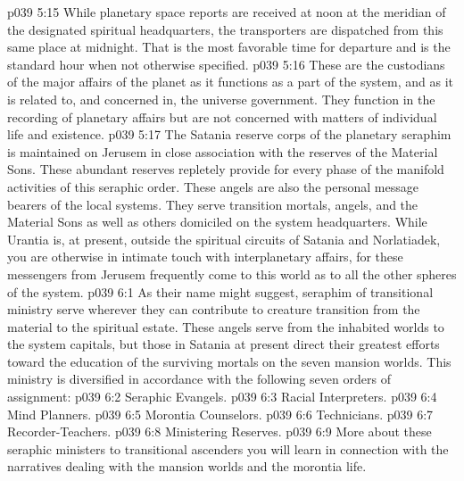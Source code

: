 \pc \vs p039 5:15 While planetary space reports are received at noon at the meridian of the designated spiritual headquarters, the transporters are dispatched from this same place at midnight. That is the most favorable time for departure and is the standard hour when not otherwise specified.
\pc \vs p039 5:16 \bibnobreakspace {} These are the custodians of the major affairs of the planet as it functions as a part of the system, and as it is related to, and concerned in, the universe government. They function in the recording of planetary affairs but are not concerned with matters of individual life and existence.
\pc \vs p039 5:17 \bibnobreakspace {} The Satania reserve corps of the planetary seraphim is maintained on Jerusem in close association with the reserves of the Material Sons. These abundant reserves repletely provide for every phase of the manifold activities of this seraphic order. These angels are also the personal message bearers of the local systems. They serve transition mortals, angels, and the Material Sons as well as others domiciled on the system headquarters. While Urantia is, at present, outside the spiritual circuits of Satania and Norlatiadek, you are otherwise in intimate touch with interplanetary affairs, for these messengers from Jerusem frequently come to this world as to all the other spheres of the system.
\vs p039 6:1 As their name might suggest, seraphim of transitional ministry serve wherever they can contribute to creature transition from the material to the spiritual estate. These angels serve from the inhabited worlds to the system capitals, but those in Satania at present direct their greatest efforts toward the education of the surviving mortals on the seven mansion worlds. This ministry is diversified in accordance with the following seven orders of assignment:\plusone
\pc \vs p039 6:2 \bibnobreakspace Seraphic Evangels.
\vs p039 6:3 \bibnobreakspace Racial Interpreters.
\vs p039 6:4 \bibnobreakspace Mind Planners.
\vs p039 6:5 \bibnobreakspace Morontia Counselors.
\vs p039 6:6 \bibnobreakspace Technicians.
\vs p039 6:7 \bibnobreakspace Recorder\hyp{}Teachers.
\vs p039 6:8 \bibnobreakspace Ministering Reserves.
\pc \vs p039 6:9 More about these seraphic ministers to transitional ascenders you will learn in connection with the narratives dealing with the mansion worlds and the morontia life.
%
